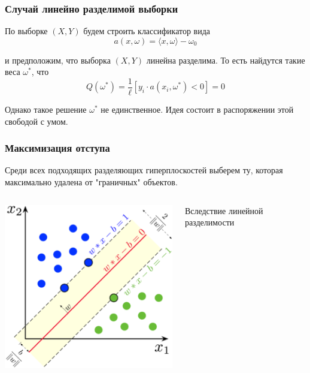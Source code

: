 \documentclass{beamer}
\begin{document}
	\begin{frame}
		\frametitle{Случай линейно разделимой выборки}
		
		По выборке $(X, Y)$ будем строить классификатор вида
		\[
		a(x, \omega) = \langle x, \omega \rangle - \omega_0
		\]
		
		и предположим, что выборка $(X, Y)$ линейна разделима. То есть найдутся такие веса $\omega^{*}$, что 
		\[
		Q(\omega^{*}) = \frac{1}{\ell} [y_i \cdot a(x_i, \omega^{*}) < 0] = 0
		\]
		
		Однако такое решение $\omega^{*}$ не единственное. Идея состоит в распоряжении этой свободой с умом.
	\end{frame}
	
	\begin{frame}
		\frametitle{Максимизация отступа}
		Среди всех подходящих разделяющих гиперплоскостей выберем ту, которая максимально удалена от "граничных" объектов.
		
		\vspace{5pt}
		
		\begin{columns}
			\begin{column}{0.4\textwidth}
				\centering
				\includegraphics[width=\textwidth]{img/svm.png}		
			\end{column}
			\begin{column}{0.6\textwidth}
				Вследствие линейной разделимости
				

\end{column}
\end{columns}
\end{frame}
\end{document}
